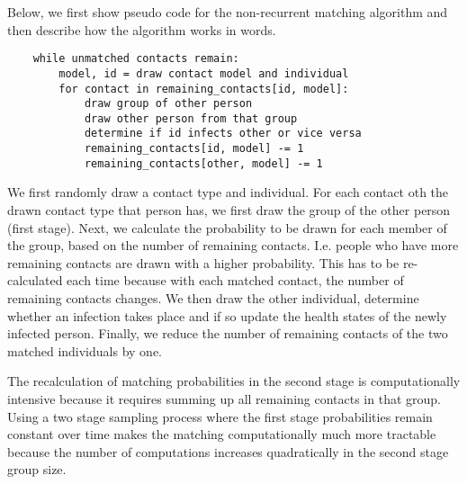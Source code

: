 Below, we first show pseudo code for the non-recurrent matching algorithm and then
describe how the algorithm works in words.


\begin{lstlisting}
    while unmatched contacts remain:
        model, id = draw contact model and individual
        for contact in remaining_contacts[id, model]:
            draw group of other person
            draw other person from that group
            determine if id infects other or vice versa
            remaining_contacts[id, model] -= 1
            remaining_contacts[other, model] -= 1
\end{lstlisting}


We first randomly draw a contact type and individual. For each contact oth the drawn
contact type that person has, we first draw the group of the other person (first stage).
Next, we calculate the probability to be drawn for each member of the group, based on
the number of remaining contacts. I.e. people who have more remaining contacts are drawn
with a higher probability. This has to be re-calculated each time because with each
matched contact, the number of remaining contacts changes. We then draw the other
individual, determine whether an infection takes place and if so update the health
states of the newly infected person. Finally, we reduce the number of remaining contacts
of the two matched individuals by one.

The recalculation of matching probabilities in the second stage is computationally
intensive because it requires summing up all remaining contacts in that group. Using a
two stage sampling process where the first stage probabilities remain constant over time
makes the matching computationally much more tractable because the number of
computations increases quadratically in the second stage group size.
